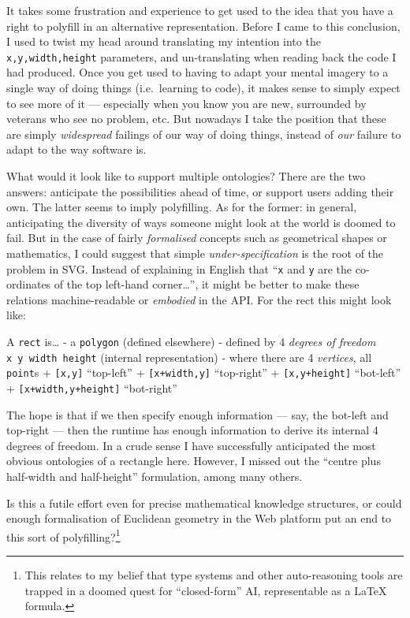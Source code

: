 \documentclass[english,submission]{programming}
\begin{document}
  It takes some frustration and experience to get used to the idea that
  you have a right to polyfill in an alternative representation. Before I
  came to this conclusion, I used to twist my head around translating my
  intention into the \texttt{x,y,width,height} parameters, and
  un-translating when reading back the code I had produced. Once you get
  used to having to adapt your mental imagery to a single way of doing
  things (i.e.~learning to code), it makes sense to simply expect to see
  more of it --- especially when you know you are new, surrounded by
  veterans who see no problem, etc. But nowadays I take the position that
  these are simply \emph{widespread} failings of our way of doing things,
  instead of \emph{our} failure to adapt to the way software is.

  What would it look like to support multiple ontologies? There are the
  two answers: anticipate the possibilities ahead of time, or support
  users adding their own. The latter seems to imply polyfilling. As for
  the former: in general, anticipating the diversity of ways someone might
  look at the world is doomed to fail. But in the case of fairly
  \emph{formalised} concepts such as geometrical shapes or mathematics, I
  could suggest that simple \emph{under-specification} is the root of the
  problem in SVG. Instead of explaining in English that ``\texttt{x} and
  \texttt{y} are the co-ordinates of the top left-hand corner\ldots{}'',
  it might be better to make these relations machine-readable or
  \emph{embodied} in the API. For the rect this might look like:

  A \texttt{rect} is\ldots{} - a \texttt{polygon} (defined elsewhere) -
  defined by 4 \emph{degrees of freedom} \texttt{x\ y\ width\ height}
  (internal representation) - where there are 4 \emph{vertices}, all
  \texttt{point}s + \texttt{{[}x,y{]}} ``top-left'' +
  \texttt{{[}x+width,y{]}} ``top-right'' + \texttt{{[}x,y+height{]}}
  ``bot-left'' + \texttt{{[}x+width,y+height{]}} ``bot-right''

  The hope is that if we then specify enough information --- say, the
  bot-left and top-right --- then the runtime has enough information to
  derive its internal 4 degrees of freedom. In a crude sense I have
  successfully anticipated the most obvious ontologies of a rectangle
  here. However, I missed out the ``centre plus half-width and
  half-height'' formulation, among many others.

  Is this a futile effort even for precise mathematical knowledge
  structures, or could enough formalisation of Euclidean geometry in the
  Web platform put an end to this sort of polyfilling?\footnote{This
    relates to my belief that type systems and other auto-reasoning tools
    are trapped in a doomed quest for ``closed-form'' AI, representable as
    a LaTeX formula.}
\end{document}

